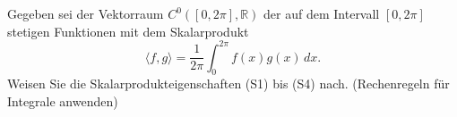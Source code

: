 Gegeben sei der Vektorraum \( C^0([0, 2\pi], \mathbb{R}) \) der auf dem Intervall \( [0, 2\pi] \) stetigen Funktionen mit dem Skalarprodukt 
\[ \langle f, g \rangle = \frac{1}{2\pi} \int_{0}^{2\pi} f(x)g(x) \, dx. \]
Weisen Sie die Skalarprodukteigenschaften (S1) bis (S4) nach. (Rechenregeln für Integrale anwenden)